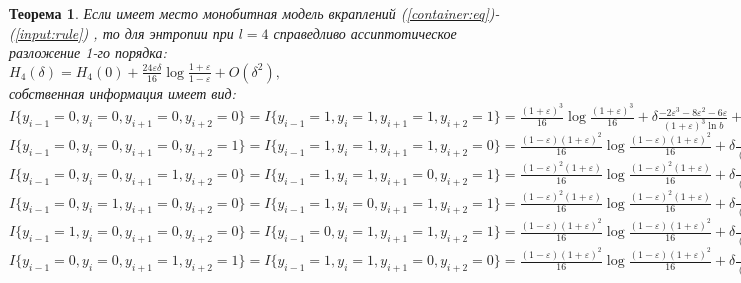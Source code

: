 \documentclass[a4paper,12pt]{article}
\theoremstyle{plain}
\newtheorem{theorem}{Теорема}[section]
\begin{document}
		\begin{theorem}
			Если имеет место монобитная модель вкраплений (\ref{container:eq})-(\ref{input:rule}) , то для энтропии при $l=4$ справедливо ассиптотическое разложение 1-го порядка:\\
			$H_4(\delta)=H_4(0)+\frac{24\varepsilon\delta}{16} \log\frac{1+\varepsilon}{1-\varepsilon}+ O(\delta^2),$\\
			собственная информация имеет вид:\\
			 $I\{y_{i-1} = 0, y_i = 0, y_{i+1} = 0, y_{i+2} = 0 \}=I\{y_{i-1} = 1, y_i = 1, y_{i+1} = 1, y_{i+2} = 1 \}= \frac{(1+\varepsilon)^3}{16}\log\frac{(1+\varepsilon)^3}{16} + \delta \frac{-2\varepsilon^3-8\varepsilon^2-6\varepsilon}{(1+\varepsilon)^3\ln b} +O(\delta^2) ;$\\
			 
			 $I\{y_{i-1} = 0, y_i = 0, y_{i+1} = 0, y_{i+2} = 1 \}=I\{y_{i-1} = 1, y_i = 1, y_{i+1} = 1, y_{i+2} = 0 \}= \frac{(1-\varepsilon)(1+\varepsilon)^2}{16}\log\frac{(1-\varepsilon)(1+\varepsilon)^2}{16} + \delta \frac{2\varepsilon^3+4\varepsilon^2-2\varepsilon}{(1-\varepsilon)(1+\varepsilon)^2\ln b} +O(\delta^2); $\\
			 
			  $I\{y_{i-1} = 0, y_i = 0, y_{i+1} = 1, y_{i+2} = 0 \}=I\{y_{i-1} = 1, y_i = 1, y_{i+1} = 0, y_{i+2} = 1 \}= \frac{(1-\varepsilon)^2(1+\varepsilon)}{16}\log\frac{(1-\varepsilon)^2(1+\varepsilon)}{16} + \delta \frac{-2\varepsilon^3+4\varepsilon^2+2\varepsilon}{(1-\varepsilon)^2(1+\varepsilon)\ln b} +O(\delta^2); $\\
			  
			   $I\{y_{i-1} = 0, y_i = 1, y_{i+1} = 0, y_{i+2} = 0 \}=I\{y_{i-1} = 1, y_i = 0, y_{i+1} = 1, y_{i+2} = 1 \}= \frac{(1-\varepsilon)^2(1+\varepsilon)}{16}\log\frac{(1-\varepsilon)^2(1+\varepsilon)}{16} + \delta \frac{-2\varepsilon^3+4\varepsilon^2+2\varepsilon}{(1-\varepsilon)^2(1+\varepsilon)\ln b} +O(\delta^2); $\\
			   
			    $I\{y_{i-1} = 1, y_i = 0, y_{i+1} = 0, y_{i+2} = 0 \}=I\{y_{i-1} = 0, y_i = 1, y_{i+1} = 1, y_{i+2} = 1 \}= \frac{(1-\varepsilon)(1+\varepsilon)^2}{16}\log\frac{(1-\varepsilon)(1+\varepsilon)^2}{16} + \delta \frac{2\varepsilon^3+4\varepsilon^2-2\varepsilon}{(1-\varepsilon)(1+\varepsilon)^2\ln b} +O(\delta^2) ;$\\
			    
			     $I\{y_{i-1} = 0, y_i = 0, y_{i+1} = 1, y_{i+2} = 1 \}=I\{y_{i-1} = 1, y_i = 1, y_{i+1} = 0, y_{i+2} = 0 \}= \frac{(1-\varepsilon)(1+\varepsilon)^2}{16}\log\frac{(1-\varepsilon)(1+\varepsilon)^2}{16} + \delta \frac{2\varepsilon^3-2\varepsilon}{(1-\varepsilon)(1+\varepsilon)^2\ln b} +O(\delta^2); $\\
			     

\end{theorem}
\end{document}

